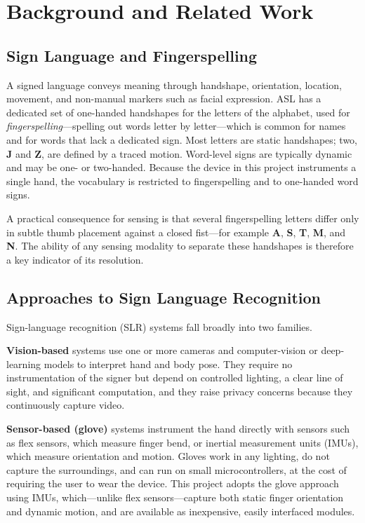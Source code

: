 \chapter{Background and Related Work}

\section{Sign Language and Fingerspelling}

A signed language conveys meaning through handshape, orientation, location,
movement, and non-manual markers such as facial expression. ASL has a
dedicated set of one-handed handshapes for the letters of the alphabet, used
for \emph{fingerspelling}—spelling out words letter by letter—which is common
for names and for words that lack a dedicated sign. Most letters are static
handshapes; two, \textbf{J} and \textbf{Z}, are defined by a traced motion.
Word-level signs are typically dynamic and may be one- or two-handed. Because
the device in this project instruments a single hand, the vocabulary is
restricted to fingerspelling and to one-handed word signs.

A practical consequence for sensing is that several fingerspelling letters
differ only in subtle thumb placement against a closed fist—for example
\textbf{A}, \textbf{S}, \textbf{T}, \textbf{M}, and \textbf{N}. The ability of
any sensing modality to separate these handshapes is therefore a key indicator
of its resolution.

\section{Approaches to Sign Language Recognition}

Sign-language recognition (SLR) systems fall broadly into two families.

\textbf{Vision-based} systems use one or more cameras and computer-vision or
deep-learning models to interpret hand and body pose. They require no
instrumentation of the signer but depend on controlled lighting, a clear line
of sight, and significant computation, and they raise privacy concerns because
they continuously capture video.

\textbf{Sensor-based (glove)} systems instrument the hand directly with
sensors such as flex sensors, which measure finger bend, or inertial
measurement units (IMUs), which measure orientation and motion. Gloves work in
any lighting, do not capture the surroundings, and can run on small
microcontrollers, at the cost of requiring the user to wear the device. This
project adopts the glove approach using IMUs, which—unlike flex sensors—capture
both static finger orientation and dynamic motion, and are available as
inexpensive, easily interfaced modules.

